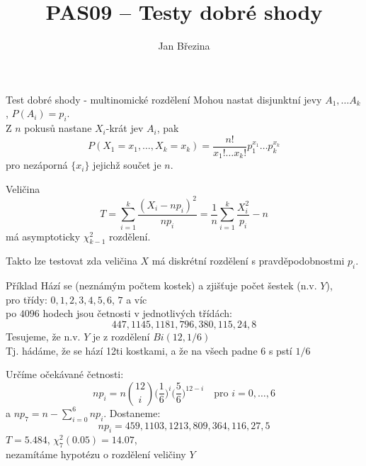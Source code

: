 \documentclass[smaller]{beamer}
\title{PAS09 -- Testy dobré shody}
\author{Jan B\v rezina}
\institute %
{
  Technical University of Liberec
}
\def\xskip{{\vspace{2ex}}}
\begin{document}
\begin{frame}
  \titlepage
\end{frame}

\def\df{\usebeamercolor[fg]{my red}\it}

\begin{frame}{Test dobré shody - multinomické rozdělení}
Mohou nastat disjunktní jevy $A_1,\dots A_k$, $P(A_i) = p_i$.\\
Z $n$ pokusů nastane $X_i$-krát jev $A_i$, pak
\[
 P(X_1 = x_1,\dots, X_k = x_k) = \frac{n!}{x_1!\dots x_k!}p_1^{x_1} \dots p_k^{x_k}
\]
pro nezáporná $\{x_i\}$ jejichž součet je $n$.

\xskip
Veličina 
\[
 T=\sum_{i=1}^k \frac{ (X_i - np_i)^2}{np_i} = \frac{1}{n}\sum_{i=1}^k \frac{X_i^2}{p_i} - n
\]
má asymptoticky $\chi^2_{k-1}$ rozdělení. 

Takto lze testovat zda veličina $X$ má diskrétní rozdělení s pravděpodobnostmi $p_i$.
\end{frame}

\begin{frame}{Příklad}
 Hází se (neznámým počtem kostek) a zjišťuje počet šestek (n.v. $Y$),\\
 pro třídy: $0,1,2,3,4,5,6$, $7$ a víc\\
 po $4096$ hodech jsou četnosti v jednotlivých třídách:
\[
 447, 1145, 1181, 796, 380, 115, 24, 8
\]
Tesujeme, že n.v. $Y$ je z rozdělení $Bi(12, 1/6)$\\
Tj. hádáme, že se hází 12ti kostkami, a že na všech padne $6$ s pstí $1/6$

Určíme očekávané četnosti:
\[
 np_i = n \binom{12}{i}\Big(\frac{1}{6}\Big)^i \Big(\frac{5}{6}\Big)^{12-i}
 \quad\text{pro $i=0,\dots,6$}
\]
a $np_7 = n- \sum_{i=0}^6 np_i$. Dostaneme:
\[
np_i = 459, 1103, 1213, 809, 364, 116, 27, 5
\]
$T = 5.484 $, $\chi^2_{7}(0.05) = 14.07$,\\
nezamítáme hypotézu o rozdělení veličiny $Y$

\end{frame}
\end{document}
